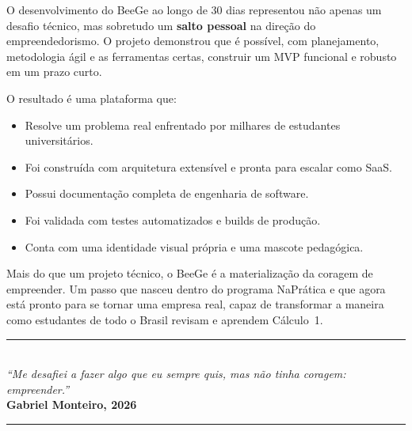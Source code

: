 \documentclass[12pt, a4paper]{article}
\begin{document}
O desenvolvimento do BeeGe ao longo de 30 dias representou n\~{a}o apenas um desafio t\'{e}cnico, mas sobretudo um \textbf{salto pessoal} na dire\c{c}\~{a}o do empreendedorismo. O projeto demonstrou que \'{e} poss\'{i}vel, com planejamento, metodologia \'{a}gil e as ferramentas certas, construir um MVP funcional e robusto em um prazo curto.

O resultado \'{e} uma plataforma que:

\begin{itemize}[leftmargin=2cm]
  \item Resolve um problema real enfrentado por milhares de estudantes universit\'{a}rios.
  \item Foi constru\'{i}da com arquitetura extens\'{i}vel e pronta para escalar como SaaS.
  \item Possui documenta\c{c}\~{a}o completa de engenharia de software.
  \item Foi validada com testes automatizados e builds de produ\c{c}\~{a}o.
  \item Conta com uma identidade visual pr\'{o}pria e uma mascote pedag\'{o}gica.
\end{itemize}

Mais do que um projeto t\'{e}cnico, o BeeGe \'{e} a materializa\c{c}\~{a}o da coragem de empreender. Um passo que nasceu dentro do programa NaPr\'{a}tica e que agora est\'{a} pronto para se tornar uma empresa real, capaz de transformar a maneira como estudantes de todo o Brasil revisam e aprendem C\'{a}lculo~1.

\vspace{1cm}

\begin{center}
\textcolor{beegePurple}{\rule{0.5\textwidth}{1pt}}\\[0.5cm]
\textit{``Me desafiei a fazer algo que eu sempre quis, mas n\~{a}o tinha coragem: empreender.''}\\[0.3cm]
\textbf{Gabriel Monteiro, 2026}\\[0.5cm]
\textcolor{beegePurple}{\rule{0.5\textwidth}{1pt}}
\end{center}
\end{document}
